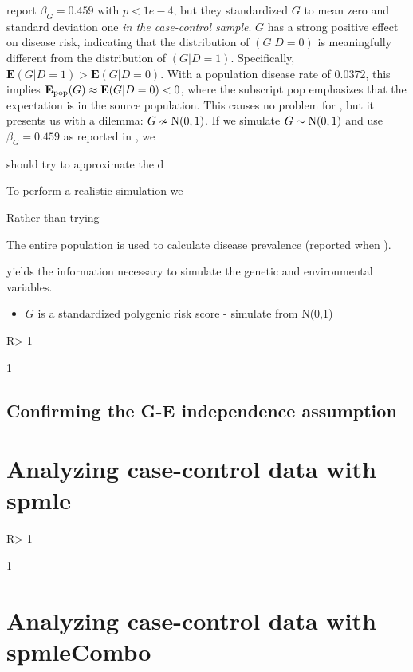 \documentclass[nojss]{jss}
\providecommand{\tightlist}{%
  \setlength{\itemsep}{0pt}\setlength{\parskip}{0pt}}
\begin{document}
\citeauthor{Wang2018unpublished} report \(\beta_G = 0.459\) with
\(p < 1e-4\), but they standardized \(G\) to mean zero and standard
deviation one \emph{in the case-control sample}. \(G\) has a strong
positive effect on disease risk, indicating that the distribution of
\((G|D=0)\) is meaningfully different from the distribution of
\((G|D=1)\). Specifically, \(\mathbf{E}(G|D=1) > \mathbf{E}(G|D=0)\).
With a population disease rate of 0.0372, this implies
\(\mathbf{E_{\rm pop}}(G) \approx \mathbf{E}(G|D=0) < 0\), where the
subscript pop emphasizes that the expectation is in the source
population. This causes no problem for \citeauthor{Wang2018unpublished},
but it presents us with a dilemma: \(G \nsim \hbox{N}(0,1)\). If we
simulate \(G \sim \hbox{N}(0,1)\) and use \(\beta_G = 0.459\) as
reported in \citeauthor{Wang2018unpublished}, we

should try to approximate the d

To perform a realistic simulation we

Rather than trying

The entire population is used to calculate disease prevalence (reported
when ).

yields the information necessary to simulate the genetic and
environmental variables.

\begin{itemize}
\tightlist
\item
  \(G\) is a standardized polygenic risk score - simulate from N(0,1)
\end{itemize}

\begin{CodeChunk}

\begin{CodeInput}
R> 1
\end{CodeInput}

\begin{CodeOutput}
[1] 1
\end{CodeOutput}
\end{CodeChunk}

\subsection{Confirming the G-E independence assumption}

\section{Analyzing case-control data with spmle} \label{sec:spmle}

\begin{CodeChunk}

\begin{CodeInput}
R> 1
\end{CodeInput}

\begin{CodeOutput}
[1] 1
\end{CodeOutput}
\end{CodeChunk}

\section{Analyzing case-control data with spmleCombo} \label{sec:spmleCombo}


\end{document}
